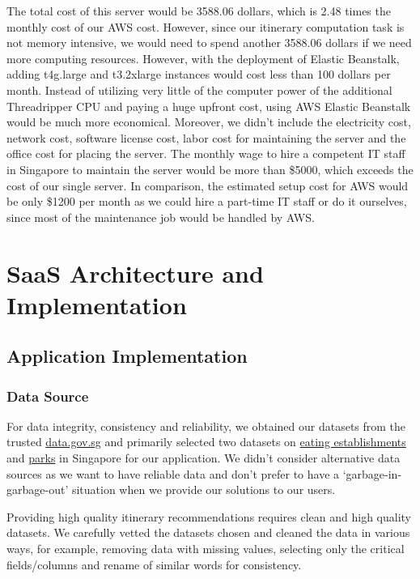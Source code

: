 \documentclass[12pt,a4paper]{article}
\begin{document}
The total cost of this server would be 3588.06 dollars, which is 2.48 times the monthly cost of our AWS cost. However, since our itinerary computation task is not memory intensive, we would need to spend another 3588.06 dollars if we need more computing resources. However, with the deployment of Elastic Beanstalk, adding t4g.large and t3.2xlarge instances would cost less than 100 dollars per month. Instead of utilizing very little of the computer power of the additional Threadripper CPU and paying a huge upfront cost, using AWS Elastic Beanstalk would be much more economical. Moreover, we didn’t include the electricity cost, network cost, software license cost, labor cost for maintaining the server and the office cost for placing the server. The monthly wage to hire a competent IT staff in Singapore to maintain the server would be more than \$5000, which exceeds the cost of our single server. In comparison, the estimated setup cost for AWS would be only \$1200 per month as we could hire a part-time IT staff or do it ourselves, since most of the maintenance job would be handled by AWS.

\section{SaaS Architecture and Implementation}
    \subsection{Application Implementation}
        \subsubsection{Data Source}
        
        For data integrity, consistency and reliability, we obtained our datasets from the trusted \url{data.gov.sg} and primarily selected two datasets on \href{https://data.gov.sg/dataset/eating-establishments}{eating establishments} and \href{https://data.gov.sg/dataset/parks}{parks} in Singapore for our application. We didn’t consider alternative data sources as we want to have reliable data and don’t prefer to have a ‘garbage-in-garbage-out’ situation when we provide our solutions to our users.

        Providing high quality itinerary recommendations requires clean and high quality datasets. We carefully vetted the datasets chosen and cleaned the data in various ways, for example, removing data with missing values, selecting only the critical fields/columns and rename of similar words for consistency.
        
\end{document}
